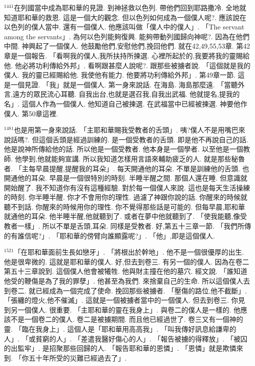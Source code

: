 \documentclass{book}
\begin{document}
$^{1441}$在列國當中成為耶和華的見證.
到神拯救以色列.
帶他們回到耶路撒冷.
全地就知道耶和華的救恩.
這是一個大的觀念.
但以色列如何成為一個僕人呢?.
應該說在以色列的僕人當中.
還有一個僕人.
他應該叫做「僕人中的僕人」.
「The servant among the servants」.
為何以色列能夠復興.
能夠帶動列國歸向神呢?.
因為在他們中間.
神興起了一個僕人.
他鼓勵他們,安慰他們,挽回他們.
就在42,49,55,53章.
第42章是一個報告.
「看啊我的僕人,我所扶持所揀選.
心裡所起於的,我要將我的靈賜給他.
他必將功利傳給外邦」.
看啊跟甚麼人說呢?.
跟那些被擄者說.
「這個就是我的僕人.
我的靈已經賜給他.
我使他有能力.
他要將功利傳給外邦」.
第49章一節.
這是一個見證.
「我」就是一個僕人.
第一身來說話.
在海島.
海島那麼遠.
「當聽外言,遠方的眾民流心耳聽.
自我出台,也就是選召我,自我出武福.
他就提名,提我的名」.
這個人作為一個僕人.
他知道自己被揀選.
在武福當中已經被揀選.
神要他作僕人.
第50章這裡.

$^{1481}$也是用第一身來說話.
「主耶和華賜我受教者的舌頭」.
咦?僕人不是用嘴巴來說話嗎?.
但這個舌頭是經過訓練的.
是一個受教者的舌頭.
即是他不再說自己的話.
他是說神所傳給他的話.
所以他是一個受教者.
他本身是一個學者.
以至他是一個教師.
他學到,他就能夠宣講.
所以我知道怎樣用言語來輔助疲乏的人.
就是那些秘魯者.
「主每早晨提醒,提醒我的耳朵」.
每天開通他的耳朵.
不單是訓練他的舌頭.
也開通他的耳朵.
早晨是一個很特別的時刻.
半睡半醒之間.
那個人還在睡.
但意識就開始醒了.
我不知道你有沒有這種經驗.
對於每一個僕人來說.
這也是每天生活操練的時刻.
你半睡半醒.
你才不會用你的理性.
過濾了神跟你說的話.
你醒來的時候就聽不到話.
你醒來的時候用你的理性.
你不覺得那些話是可能的.
但每早晨,耶和華就通他的耳朵.
他半睡半醒,他就聽到了.
或者在夢中他就聽到了.
「使我能聽,像受教者一樣」.
所以不單是舌頭,耳朵.
同樣是受教者.
好,第五十三章一節.
「我們所傳的有誰信呢?」.
「耶和華的傍臂向誰顯露呢?」.
「他」,即是這個僕人.

$^{1521}$「在耶和華面前生長如戀牙」.
「將根出於幹地」.
他不是一個很優厚的出生.
他是很卑微的.
這就是耶和華的僕人.
好,但去到卷三.
有另一個的僕人.
因為在卷二第五十三章說到.
這個僕人他會被犧牲.
他與財主撞在他的墓穴.
經文說.
「誰知道他受的鞭傷是為了我的罪孽」.
他甚至為我們.
來捨棄自己的生命.
所以這個僕人去到卷二.
就已經成為一個完成了使命.
挽回那些被擄者.
「壓傷的路位,他不截斷」.
「張纏的燈火,他不催滅」.
這就是一個被擄者當中的一個僕人.
但去到卷三.
你見到另一個僕人.
很重要.
「主耶和華的靈在我身上」.
與卷二的僕人是一樣的.
他應該不是一個卷二的僕人.
卷二是被擄期間.
而且他已經過世了.
卷三又有一個神的靈.
「臨在我身上」.
這個人是「耶和華用高高我」.
「叫我傳好訊息給謙卑的人」.
「或貧窮的人」.
「差遣我醫好傷心的人」.
「報告被擄的得釋放」.
「被囚的出監牢」.
是招聚那些回歸的人.
「報告耶和華的恩憐」.
「恩憐」就是欺憐來到.
「你五十年所受的災難已經過去了」.
\end{document}
